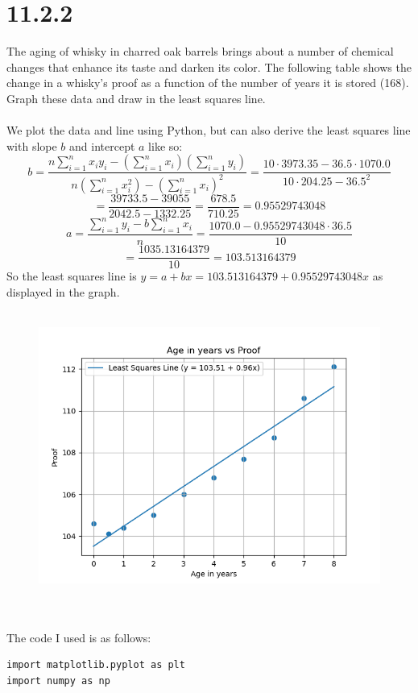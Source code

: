 \documentclass{article}
\begin{document}
{\section*{11.2.2}
The aging of whisky in charred oak barrels brings about a number of chemical changes that enhance its taste and darken its color. The following table shows the change in a whisky's proof as a function of the number of years it is stored (168). Graph these
data and draw in the least squares line.
\\
\\
We plot the data and line using Python, but can also derive the least squares line with slope \(b\) and intercept \(a\) like so:
\[
b = \frac{n\sum_{i=1}^n x_i y_i - (\sum_{i=1}^n x_i) (\sum_{i=1}^{n} y_i)}{n(\sum_{i=1}^n x_i^2) - (\sum_{i=1}^{n} x_i)^2} = \frac{10 \cdot 3973.35 - 36.5 \cdot 1070.0}{10 \cdot 204.25 - 36.5^2}
\]
\[
= \frac{39733.5 - 39055}{2042.5 - 1332.25} = \frac{678.5}{710.25} = 0.95529743048
\]
\[
a = \frac{\sum_{i=1}^{n} y_i - b \sum_{i=1}^{n}x_i}{n} = \frac{1070.0 - 0.95529743048 \cdot 36.5}{10}
\]
\[
= \frac{1035.13164379}{10} = 103.513164379
\]
So the least squares line is \(y = a + bx = 103.513164379 + 0.95529743048x\) as displayed in the graph.
\\
\\
\begin{figure}[h!]
  \centering
  \includegraphics[width=500pt]{whisky_1122.png}
\end{figure}
\\
\\
The code I used is as follows:
\begin{verbatim}
import matplotlib.pyplot as plt
import numpy as np


\end{verbatim}}
\end{document}
